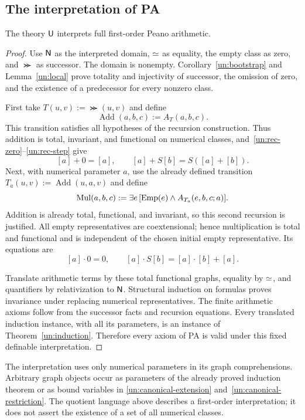 \subsection{The interpretation of PA}

\begin{theorem}\label{un:pa-lower}
The theory $\mathsf{U}$ interprets full first-order Peano arithmetic.
\end{theorem}
\begin{proof}
Use $\mathsf{N}$ as the interpreted domain, $\mathrel{\simeq}$ as equality, the empty class
as zero, and $\Succ$ as successor. The domain is nonempty.
Corollary~\ref{un:bootstrap} and Lemma~\ref{un:local} prove totality
and injectivity of successor, the omission of zero, and the existence
of a predecessor for every nonzero class.

First take $T(u,v):=\Succ(u,v)$ and define
\[
                         \operatorname{Add}(a,b,c):=A_T(a,b,c).
\]
This transition satisfies all hypotheses of the recursion construction.
Thus addition is total, invariant, and functional on numerical classes,
and~\eqref{un:rec-zero}--\eqref{un:rec-step} give
\[
                       [a]+0=[a],\qquad
                       [a]+S[b]=S([a]+[b]).
\]
Next, with numerical parameter $a$, use the already defined transition
$T_a(u,v):=\operatorname{Add}(u,a,v)$ and define
\[
 \operatorname{Mul}(a,b,c):=
             \exists e\,[\operatorname{Emp}(e)\land A_{T_a}(e,b,c;a)].
\]
Addition is already total, functional, and invariant, so this second
recursion is justified. All empty representatives are coextensional;
hence multiplication is total and functional and is independent of
the chosen initial empty representative. Its equations are
\[
                       [a]\cdot0=0,\qquad
                       [a]\cdot S[b]=[a]\cdot[b]+[a].
\]

Translate arithmetic terms by these total functional graphs, equality
by $\mathrel{\simeq}$, and quantifiers by relativization to $\mathsf{N}$. Structural
induction on formulas proves invariance under replacing numerical
representatives. The finite arithmetic axioms follow from the
successor facts and recursion equations. Every translated induction
instance, with all its parameters, is an instance of
Theorem~\ref{un:induction}. Therefore every axiom of PA is valid under
this fixed definable interpretation.
\end{proof}

The interpretation uses only numerical parameters in its graph
comprehensions. Arbitrary graph objects occur as parameters of the
already proved induction theorem or as bound variables in
\eqref{un:canonical-extension} and~\eqref{un:canonical-restriction}.
The quotient language above describes a first-order interpretation;
it does not assert the existence of a set of all numerical classes.

